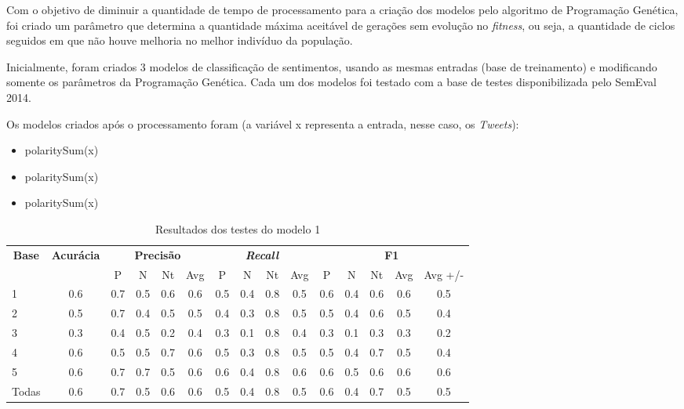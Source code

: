 \documentclass[12pt]{article}
\begin{document}
Com o objetivo de diminuir a quantidade de tempo de processamento para a criação dos modelos pelo algoritmo de Programação Genética, foi criado um parâmetro que determina a quantidade máxima aceitável de gerações sem evolução no \emph{fitness}, ou seja, a quantidade de ciclos seguidos em que não houve melhoria no melhor indivíduo da população. 

Inicialmente, foram criados 3 modelos de classificação de sentimentos, usando as mesmas entradas (base de treinamento) e modificando somente os parâmetros da Programação Genética. Cada um dos modelos foi testado com a base de testes disponibilizada pelo SemEval 2014.

Os modelos criados após o processamento foram (a variável x representa a entrada, nesse caso, os \emph{Tweets}):
\begin{itemize}
	\item{polaritySum(x)}
	\item{polaritySum(x)}
	\item{polaritySum(x)}		
\end{itemize}


\begin{table}[]
\centering
\begin{tabular}{lcccccccccccccc}
\multicolumn{1}{c}{\textbf{Base}} & \textbf{Acurácia} & \multicolumn{4}{c}{\textbf{Precisão}} & \multicolumn{4}{c}{\textit{\textbf{Recall}}} & \multicolumn{5}{c}{\textbf{F1}} \\
 &  & \multicolumn{1}{c|}{P} & \multicolumn{1}{c|}{N} & \multicolumn{1}{c|}{Nt} & Avg & \multicolumn{1}{c|}{P} & \multicolumn{1}{c|}{N} & \multicolumn{1}{c|}{Nt} & Avg & \multicolumn{1}{c|}{P} & \multicolumn{1}{c|}{N} & \multicolumn{1}{c|}{Nt} & \multicolumn{1}{c|}{Avg} & Avg +/- \\
1 & 0.6 & 0.7 & 0.5 & 0.6 & 0.6 & 0.5 & 0.4 & 0.8 & 0.5 & 0.6 & 0.4 & 0.6 & 0.6 & 0.5 \\ \hline
2 & 0.5 & 0.7 & 0.4 & 0.5 & 0.5 & 0.4 & 0.3 & 0.8 & 0.5 & 0.5 & 0.4 & 0.6 & 0.5 & 0.4 \\ \hline
3 & 0.3 & 0.4 & 0.5 & 0.2 & 0.4 & 0.3 & 0.1 & 0.8 & 0.4 & 0.3 & 0.1 & 0.3 & 0.3 & 0.2 \\ \hline
4 & 0.6 & 0.5 & 0.5 & 0.7 & 0.6 & 0.5 & 0.3 & 0.8 & 0.5 & 0.5 & 0.4 & 0.7 & 0.5 & 0.4 \\ \hline
5 & 0.6 & 0.7 & 0.7 & 0.5 & 0.6 & 0.6 & 0.4 & 0.8 & 0.6 & 0.6 & 0.5 & 0.6 & 0.6 & 0.6 \\ \hline
Todas & 0.6 & 0.7 & 0.5 & 0.6 & 0.6 & 0.5 & 0.4 & 0.8 & 0.5 & 0.6 & 0.4 & 0.7 & 0.5 & 0.5 \\ \hline
\end{tabular}
\caption{Resultados dos testes do modelo 1}
\label{test1}
\end{table}
\end{document}

